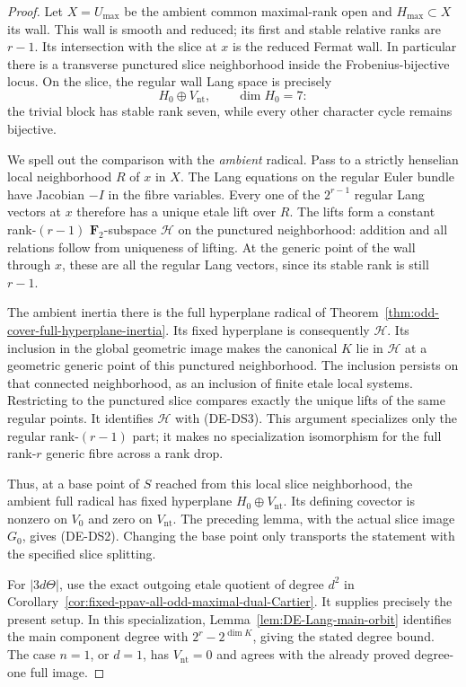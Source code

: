 \begin{proof}
Let \(X=U_{\max}\) be the ambient common maximal-rank open and
\(H_{\max}\subset X\) its wall. This wall is smooth and reduced;
its first and stable relative ranks are \(r-1\). Its intersection
with the slice at \(x\) is the reduced Fermat wall. In particular
there is a transverse punctured slice neighborhood inside the
Frobenius-bijective locus. On the slice, the regular wall Lang
space is precisely
\[
                    H_0\oplus V_{\mathrm{nt}},
                    \qquad \dim H_0=7:
 \tag{DE-DS3}
\]
the trivial block has stable rank seven, while every other character
cycle remains bijective.

We spell out the comparison with the \emph{ambient} radical. Pass
to a strictly henselian local neighborhood \(R\) of \(x\) in \(X\).
The Lang equations on the regular Euler bundle have Jacobian
\(-I\) in the fibre variables. Every one of the \(2^{r-1}\)
regular Lang vectors at \(x\) therefore has a unique etale lift
over \(R\). The lifts form a constant rank-\((r-1)\)
\(\mathbf F_2\)-subspace \(\mathcal H\) on the punctured
neighborhood: addition and all relations follow from uniqueness
of lifting. At the generic point of the wall through \(x\),
these are all the regular Lang vectors, since its stable rank is
still \(r-1\).

The ambient inertia there is the full hyperplane radical of
Theorem~\ref{thm:odd-cover-full-hyperplane-inertia}. Its fixed
hyperplane is consequently \(\mathcal H\). Its inclusion in the
global geometric image makes the canonical \(K\) lie in
\(\mathcal H\) at a geometric generic point of this punctured
neighborhood. The inclusion persists on that connected neighborhood,
as an inclusion of finite etale local systems. Restricting to the
punctured slice compares exactly the unique lifts of the same
regular points. It identifies \(\mathcal H\) with (DE-DS3).
This argument specializes only the regular rank-\((r-1)\) part;
it makes no specialization isomorphism for the full rank-\(r\)
generic fibre across a rank drop.

Thus, at a base point of \(S\) reached from this local slice
neighborhood, the ambient full radical has fixed hyperplane
\(H_0\oplus V_{\mathrm{nt}}\). Its defining covector is nonzero
on \(V_0\) and zero on \(V_{\mathrm{nt}}\). The preceding lemma,
with the actual slice image \(G_0\), gives (DE-DS2).
Changing the base point only transports the statement with the
specified slice splitting.

For \(|3d\Theta|\), use the exact outgoing etale quotient of
degree \(d^2\) in
Corollary~\ref{cor:fixed-ppav-all-odd-maximal-dual-Cartier}.
It supplies precisely the present setup. In this specialization,
Lemma~\ref{lem:DE-Lang-main-orbit} identifies the main component
degree with \(2^r-2^{\dim K}\), giving the stated degree bound.
The case \(n=1\), or \(d=1\), has \(V_{\mathrm{nt}}=0\) and
agrees with the already proved degree-one full image.
\end{proof}

